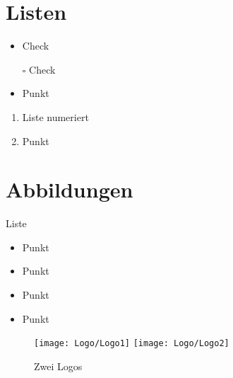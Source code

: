 \documentclass[a4paper,fontsize=14pt,DIV=calc,fleqn,parskip=half]{scrartcl}
\title{\color{blau5}{\thema}}
\author{\name}
\date{\today}
\begin{document}
\thispagestyle{empty}
\maketitle
\newpage
\setcounter{page}{1}

\section*{Listen}%

\begin{itemize}[label=\checkmark] %
	\item Check
\end{itemize}

\begin{itemize} 
	\item [$\square$] Check
\end{itemize}

\begin{itemize} 
	\item Punkt
\end{itemize}
\begin{enumerate} 
	\item Liste numeriert
	\item Punkt
\end{enumerate}

\newpage
\section*{Abbildungen}%

Liste

\begin{itemize} 
	\item Punkt
	\item Punkt
	\item Punkt
	\item Punkt
\end{itemize}
		
\begin{figure}[!h]
\centering
{}
{\texttt{[image: Logo/Logo1]}}
{\texttt{[image: Logo/Logo2]}}
\caption{Zwei Logos}\label{Logos}
\end{figure}

\newpage
\end{document}
